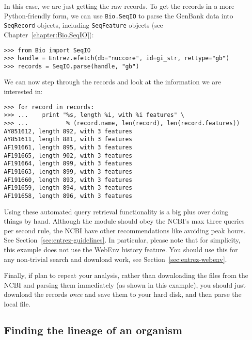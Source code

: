 \documentclass{report}
\begin{document}
In this case, we are just getting the raw records. To get the records in a more Python-friendly form, we can use \verb+Bio.SeqIO+ to parse the GenBank data into \verb|SeqRecord| objects, including \verb|SeqFeature| objects (see Chapter~\ref{chapter:Bio.SeqIO}):

\begin{verbatim}
>>> from Bio import SeqIO
>>> handle = Entrez.efetch(db="nuccore", id=gi_str, rettype="gb")
>>> records = SeqIO.parse(handle, "gb")
\end{verbatim}

\noindent We can now step through the records and look at the information we are interested in:
\begin{verbatim}
>>> for record in records: 
>>> ...    print "%s, length %i, with %i features" \
>>> ...           % (record.name, len(record), len(record.features))
AY851612, length 892, with 3 features
AY851611, length 881, with 3 features
AF191661, length 895, with 3 features
AF191665, length 902, with 3 features
AF191664, length 899, with 3 features
AF191663, length 899, with 3 features
AF191660, length 893, with 3 features
AF191659, length 894, with 3 features
AF191658, length 896, with 3 features
\end{verbatim}

Using these automated query retrieval functionality is a big plus over doing things by hand.   Although the module should obey the NCBI's max three queries per second rule, the NCBI have other recommendations like avoiding peak hours.  See Section~\ref{sec:entrez-guidelines}.
In particular, please note that for simplicity, this example does not use the WebEnv history feature.  You should use this for any non-trivial search and download work, see Section~\ref{sec:entrez-webenv}.

Finally, if plan to repeat your analysis, rather than downloading the files from the NCBI and parsing them immediately (as shown in this example), you should just download the records \emph{once} and save them to your hard disk, and then parse the local file.

\subsection{Finding the lineage of an organism}
\end{document}
